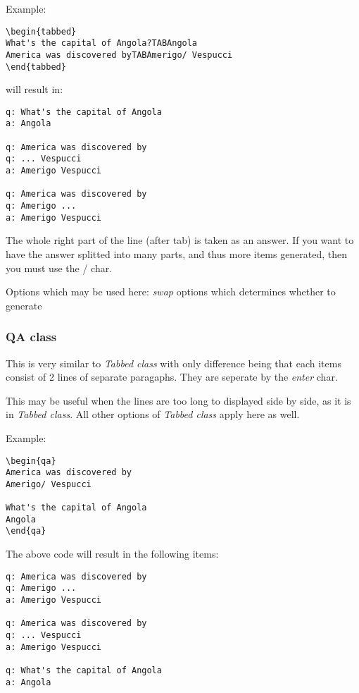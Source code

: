 \documentclass[a4paper,11pt]{article}
\begin{document}
Example:
\begin{verbatim}
\begin{tabbed}
What's the capital of Angola?TABAngola
America was discovered byTABAmerigo/ Vespucci
\end{tabbed}
\end{verbatim}

will result in:
\begin{verbatim}
q: What's the capital of Angola
a: Angola

q: America was discovered by
q: ... Vespucci
a: Amerigo Vespucci

q: America was discovered by
q: Amerigo ...
a: Amerigo Vespucci
\end{verbatim}


The whole right part of the line (after tab) is taken as an answer.
If you want to have the answer splitted into many parts, and thus more items
generated, then you must use the / char.

Options which may be used here:
\textit{swap} options which determines whether to generate




\subsubsection{QA class}
This is very similar to \textit{Tabbed class} with only difference being that
each items consist of 2 lines of separate paragaphs. They are seperate by the
\emph{enter} char.

This may be useful when the lines are too long to displayed side by side, as it
is in \emph{Tabbed class}.
All other options of \emph{Tabbed class} apply here as well.

Example:
\begin{verbatim}
\begin{qa}
America was discovered by
Amerigo/ Vespucci

What's the capital of Angola
Angola
\end{qa}
\end{verbatim}

The above code will result in the following items:
\begin{verbatim}
q: America was discovered by
q: Amerigo ...
a: Amerigo Vespucci

q: America was discovered by
q: ... Vespucci
a: Amerigo Vespucci

q: What's the capital of Angola
a: Angola
\end{verbatim}
\end{document}
